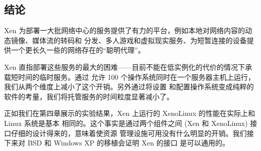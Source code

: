 \subsection{结论}

Xen 为部署一大批网络中心的服务提供了有力的平台，例如本地对网络内容的动态镜像、媒体流的转码和
分发、多人游戏和虚拟现实服务、为短暂连接的设备提供一个更长久一些的网络存在的“聪明代理”。

Xen 直指部署这些服务的最大的困难——目前不能在低实例化的代价的情况下承载短时间的临时服务。通过
允许 100 个操作系统同时在一个服务器主机上运行，我们从两个维度上减小了这个开销。另外通过将设置
和配置操作系统变成纯粹的软件的考量，我们将托管服务的时间粒度显著减小了。

正如我们在第四章展示的实验结果，Xen 上运行的 XenoLinux 的性能在实际上和 Linux 系统是基本
相同的。这个事实是通过两个组件之间 (Xen 和 XenoLinux) 接口仔细的设计得来的，意味着使资源
管理设施可用没有什么明显的开销。我们接下来对 BSD 和 Windows XP 的移植会证明 Xen 的接口
是可以通用的。
